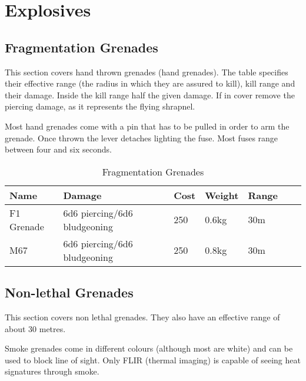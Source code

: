 \section{Explosives}

\subsection{Fragmentation Grenades}

This section covers hand thrown grenades (hand grenades). The table specifies
their effective range (the radius in which they are assured to kill), kill
range and their damage. Inside the kill range half the given damage. If in
cover remove the piercing damage, as it represents the flying shrapnel.

Most hand grenades come with a pin that has to be pulled in order to arm the
grenade. Once thrown the lever detaches lighting the fuse. Most fuses range
between four and six seconds.

\begin{table}
  \caption{Fragmentation Grenades}
  \label{tab:Frag}
  \begin{center}
    \begin{tabular}{| l | l | l | l | l | l | l |}

      \hline
      \textbf{Name} & \textbf{Damage} & \textbf{Cost} &
      \textbf{Weight} & \textbf{Range} \\ \hline

      F1 Grenade  & 6d6 piercing/6d6 bludgeoning & 250 & 0.6kg & 30m \\ \hline
      M67         & 6d6 piercing/6d6 bludgeoning & 250 & 0.8kg & 30m \\ \hline

    \end{tabular}
  \end{center}
\end{table}

\subsection{Non-lethal Grenades}

This section covers non lethal grenades. They also have an effective range
of about 30 metres.

Smoke grenades come in different colours (although most are white) and can be
used to block line of sight. Only FLIR (thermal imaging) is capable of seeing
heat signatures through smoke.

